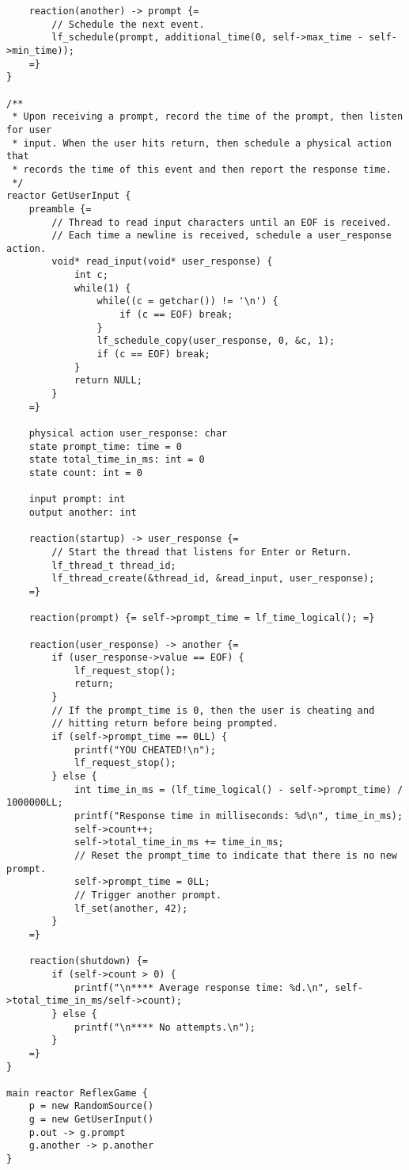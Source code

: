 \documentclass{article}
\begin{document}
\begin{verbatim}
    reaction(another) -> prompt {=
        // Schedule the next event.
        lf_schedule(prompt, additional_time(0, self->max_time - self->min_time));
    =}
}

/**
 * Upon receiving a prompt, record the time of the prompt, then listen for user
 * input. When the user hits return, then schedule a physical action that
 * records the time of this event and then report the response time.
 */
reactor GetUserInput {
    preamble {=
        // Thread to read input characters until an EOF is received.
        // Each time a newline is received, schedule a user_response action.
        void* read_input(void* user_response) {
            int c;
            while(1) {
                while((c = getchar()) != '\n') {
                    if (c == EOF) break;
                }
                lf_schedule_copy(user_response, 0, &c, 1);
                if (c == EOF) break;
            }
            return NULL;
        }
    =}

    physical action user_response: char
    state prompt_time: time = 0
    state total_time_in_ms: int = 0
    state count: int = 0

    input prompt: int
    output another: int

    reaction(startup) -> user_response {=
        // Start the thread that listens for Enter or Return.
        lf_thread_t thread_id;
        lf_thread_create(&thread_id, &read_input, user_response);
    =}

    reaction(prompt) {= self->prompt_time = lf_time_logical(); =}

    reaction(user_response) -> another {=
        if (user_response->value == EOF) {
            lf_request_stop();
            return;
        }
        // If the prompt_time is 0, then the user is cheating and
        // hitting return before being prompted.
        if (self->prompt_time == 0LL) {
            printf("YOU CHEATED!\n");
            lf_request_stop();
        } else {
            int time_in_ms = (lf_time_logical() - self->prompt_time) / 1000000LL;
            printf("Response time in milliseconds: %d\n", time_in_ms);
            self->count++;
            self->total_time_in_ms += time_in_ms;
            // Reset the prompt_time to indicate that there is no new prompt.
            self->prompt_time = 0LL;
            // Trigger another prompt.
            lf_set(another, 42);
        }
    =}

    reaction(shutdown) {=
        if (self->count > 0) {
            printf("\n**** Average response time: %d.\n", self->total_time_in_ms/self->count);
        } else {
            printf("\n**** No attempts.\n");
        }
    =}
}

main reactor ReflexGame {
    p = new RandomSource()
    g = new GetUserInput()
    p.out -> g.prompt
    g.another -> p.another
}
\end{verbatim}
\end{document}
